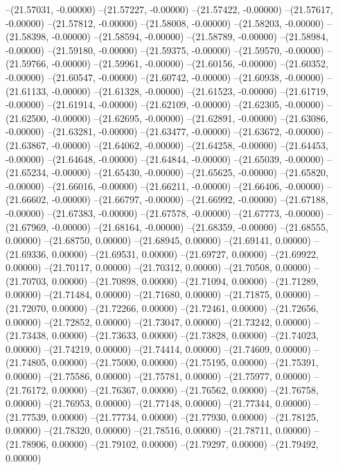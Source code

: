 --(21.57031, -0.00000)
--(21.57227, -0.00000)
--(21.57422, -0.00000)
--(21.57617, -0.00000)
--(21.57812, -0.00000)
--(21.58008, -0.00000)
--(21.58203, -0.00000)
--(21.58398, -0.00000)
--(21.58594, -0.00000)
--(21.58789, -0.00000)
--(21.58984, -0.00000)
--(21.59180, -0.00000)
--(21.59375, -0.00000)
--(21.59570, -0.00000)
--(21.59766, -0.00000)
--(21.59961, -0.00000)
--(21.60156, -0.00000)
--(21.60352, -0.00000)
--(21.60547, -0.00000)
--(21.60742, -0.00000)
--(21.60938, -0.00000)
--(21.61133, -0.00000)
--(21.61328, -0.00000)
--(21.61523, -0.00000)
--(21.61719, -0.00000)
--(21.61914, -0.00000)
--(21.62109, -0.00000)
--(21.62305, -0.00000)
--(21.62500, -0.00000)
--(21.62695, -0.00000)
--(21.62891, -0.00000)
--(21.63086, -0.00000)
--(21.63281, -0.00000)
--(21.63477, -0.00000)
--(21.63672, -0.00000)
--(21.63867, -0.00000)
--(21.64062, -0.00000)
--(21.64258, -0.00000)
--(21.64453, -0.00000)
--(21.64648, -0.00000)
--(21.64844, -0.00000)
--(21.65039, -0.00000)
--(21.65234, -0.00000)
--(21.65430, -0.00000)
--(21.65625, -0.00000)
--(21.65820, -0.00000)
--(21.66016, -0.00000)
--(21.66211, -0.00000)
--(21.66406, -0.00000)
--(21.66602, -0.00000)
--(21.66797, -0.00000)
--(21.66992, -0.00000)
--(21.67188, -0.00000)
--(21.67383, -0.00000)
--(21.67578, -0.00000)
--(21.67773, -0.00000)
--(21.67969, -0.00000)
--(21.68164, -0.00000)
--(21.68359, -0.00000)
--(21.68555, 0.00000)
--(21.68750, 0.00000)
--(21.68945, 0.00000)
--(21.69141, 0.00000)
--(21.69336, 0.00000)
--(21.69531, 0.00000)
--(21.69727, 0.00000)
--(21.69922, 0.00000)
--(21.70117, 0.00000)
--(21.70312, 0.00000)
--(21.70508, 0.00000)
--(21.70703, 0.00000)
--(21.70898, 0.00000)
--(21.71094, 0.00000)
--(21.71289, 0.00000)
--(21.71484, 0.00000)
--(21.71680, 0.00000)
--(21.71875, 0.00000)
--(21.72070, 0.00000)
--(21.72266, 0.00000)
--(21.72461, 0.00000)
--(21.72656, 0.00000)
--(21.72852, 0.00000)
--(21.73047, 0.00000)
--(21.73242, 0.00000)
--(21.73438, 0.00000)
--(21.73633, 0.00000)
--(21.73828, 0.00000)
--(21.74023, 0.00000)
--(21.74219, 0.00000)
--(21.74414, 0.00000)
--(21.74609, 0.00000)
--(21.74805, 0.00000)
--(21.75000, 0.00000)
--(21.75195, 0.00000)
--(21.75391, 0.00000)
--(21.75586, 0.00000)
--(21.75781, 0.00000)
--(21.75977, 0.00000)
--(21.76172, 0.00000)
--(21.76367, 0.00000)
--(21.76562, 0.00000)
--(21.76758, 0.00000)
--(21.76953, 0.00000)
--(21.77148, 0.00000)
--(21.77344, 0.00000)
--(21.77539, 0.00000)
--(21.77734, 0.00000)
--(21.77930, 0.00000)
--(21.78125, 0.00000)
--(21.78320, 0.00000)
--(21.78516, 0.00000)
--(21.78711, 0.00000)
--(21.78906, 0.00000)
--(21.79102, 0.00000)
--(21.79297, 0.00000)
--(21.79492, 0.00000)
